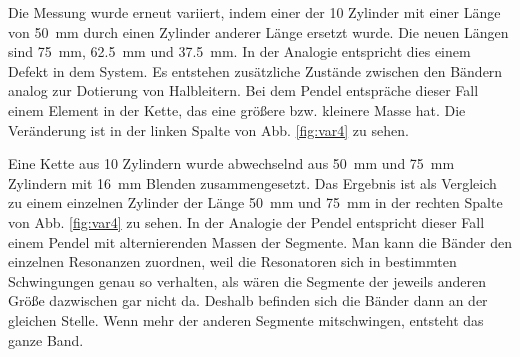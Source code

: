 Die Messung wurde erneut variiert, indem einer der \num{10} Zylinder mit einer Länge von \SI{50}{\milli\meter} durch einen Zylinder anderer Länge ersetzt wurde. Die neuen Längen sind \SI{75}{\milli\meter}, \SI{62.5}{\milli\meter} und \SI{37.5}{\milli\meter}. In der Analogie entspricht dies einem Defekt in dem System.
Es entstehen zusätzliche Zustände zwischen den Bändern analog zur Dotierung von Halbleitern.
Bei dem Pendel entspräche dieser Fall einem Element in der Kette, das eine größere bzw. kleinere Masse hat. 
Die Veränderung ist in der linken Spalte von Abb. \ref{fig:var4} zu sehen.

Eine Kette aus 10 Zylindern wurde abwechselnd aus \SI{50}{\milli\meter} und \SI{75}{\milli\meter} Zylindern mit \SI{16}{\milli\meter} Blenden zusammengesetzt.
Das Ergebnis ist als Vergleich zu einem einzelnen Zylinder der Länge \SI{50}{\milli\metre} und \SI{75}{\milli\metre} in der rechten Spalte von Abb. \ref{fig:var4} zu sehen. In der Analogie der Pendel entspricht dieser Fall einem Pendel mit alternierenden Massen der Segmente.
Man kann die Bänder den einzelnen Resonanzen zuordnen, weil die Resonatoren sich in bestimmten Schwingungen genau so verhalten, als wären die Segmente der jeweils anderen Größe dazwischen gar nicht da. Deshalb befinden sich die Bänder dann an der gleichen Stelle. Wenn mehr der anderen Segmente mitschwingen, entsteht das ganze Band.
 
